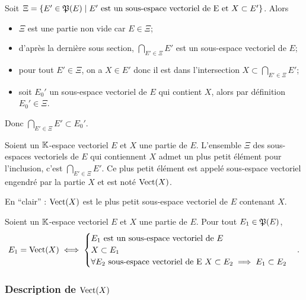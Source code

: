 Soit $\Xi=\left\{E' \in \mathfrak{P}(E)\mathrel{}\middle|\mathrel{}E' \text{~est un sous-espace vectoriel de E et } X \subset E'\right\}$. Alors
\begin{itemize}
\item $\Xi$ est une partie non vide car $E \in \Xi$;
\item d'après la dernière sous section, $\bigcap_{E' \in \Xi} E'$ est un sous-espace vectoriel de $E$;
\item pour tout $E' \in \Xi$, on a $X \in E'$ donc il est dans l'intersection $X \subset \bigcap_{E' \in \Xi} E'$;
\item soit $E_0'$ un sous-espace vectoriel de $E$ qui contient $X$, alors par définition $E_0' \in \Xi$.
\end{itemize}

Donc $\bigcap_{E' \in \Xi} E' \subset E_0'$.

\begin{defdef}
  Soient un $\mathbb{K}$-espace vectoriel $E$ et $X$ une partie de $E$. L'ensemble $\Xi$ des sous-espaces vectoriels de $E$ qui contiennent $X$ admet un plus petit élément pour l'inclusion, c'est $\bigcap_{E' \in \Xi} E'$. Ce plus petit élément est appelé sous-espace vectoriel engendré par la partie $X$ et est noté $\operatorname{Vect}(X)$.

  En ``clair'' : $\operatorname{Vect}(X)$ est le plus petit sous-espace vectoriel de $E$ contenant $X$.
\end{defdef}

\begin{prop}
  Soient un $\mathbb{K}$-espace vectoriel $E$ et $X$ une partie de $E$. Pour tout $E_1 \in \mathfrak{P}(E)$,
  \begin{equation}
    E_1 = \operatorname{Vect}(X) \iff
    \begin{cases}
      E_1 \text{~est un sous-espace vectoriel de } E \\
      X \subset E_1 \\
      \forall E_2 \text{~sous-espace vectoriel de E } X \subset E_2 \implies E_1 \subset E_2
    \end{cases}.
  \end{equation}
\end{prop}

\subsubsection{Description de $\operatorname{Vect}(X)$}

